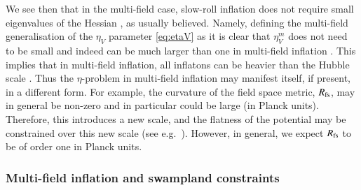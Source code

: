 We see then that in the multi-field case, slow-roll inflation does not require small eigenvalues of the Hessian \cite{Chakraborty:2019dfh,Aragam:2021scu}, as usually believed. Namely, defining the multi-field generalisation of the $\eta_V$ parameter \eqref{eq:etaV} as
\be\label{etaVmulti}
\setlength\fboxsep{0.25cm}
\setlength\fboxrule{0.4pt}
\ee
it is clear that $\eta_V^m$ does not need to be small and indeed can  be much  larger than one in multi-field inflation \cite{Chakraborty:2019dfh,Aragam:2021scu}. This implies that in multi-field inflation, all inflatons can be heavier than the Hubble scale \cite{Chakraborty:2019dfh}.
Thus the $\eta$-problem in multi-field inflation may manifest itself, if present, in a different form. For example, the curvature of the field space metric, $R_{\rm fs}$, may in general be non-zero and in particular could be large (in Planck units). Therefore, this introduces a new scale, and the flatness of the potential may be constrained over this new scale (see e.g.~\cite{Renaux-Petel:2021yxh}). However, in general, we expect $R_{\rm fs}$ to be of order one in Planck units.

\subsubsection*{ Multi-field inflation and swampland constraints}

